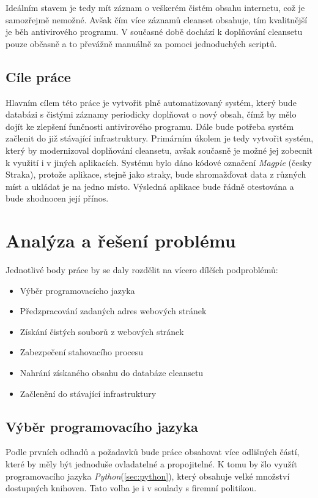 \documentclass[thesis=M,czech,hidelinks]{FITthesis}[2013/05/06]
\begin{document}
Ideálním stavem je tedy mít záznam o veškerém čistém obsahu internetu, což je samozřejmě nemožné. Avšak čím více záznamů cleanset obsahuje, tím kvalitnější je běh antivirového programu. V současné době dochází k doplňování cleansetu pouze občasně a to převážně manuálně za pomoci jednoduchých scriptů.

\section{Cíle práce} 
 Hlavním cílem této práce je vytvořit plně automatizovaný systém, který bude databázi s čistými záznamy periodicky doplňovat o nový obsah, čímž by mělo dojít ke zlepšení funčnosti antivirového programu. Dále bude potřeba systém začlenit do již stávající  infrastruktury. Primárním úkolem je tedy vytvořit systém, který by modernizoval doplňování cleansetu, avšak současně je možné jej zobecnit k využití i v jiných aplikacích. Systému bylo dáno kódové označení \textit{Magpie} (česky Straka), protože aplikace, stejně jako straky, bude shromažďovat data z různých míst a ukládat je na jedno místo. Výsledná aplikace bude řádně otestována a bude zhodnocen její přínos.


\chapter{Analýza a řešení problému}
Jednotlivé body práce by se daly rozdělit na vícero dílčích podproblémů:

\begin{itemize}
	\item Výběr programovacícho jazyka
	\item Předzpracování zadaných adres webových stránek
	\item Získání čistých souborů z webových stránek
	\item Zabezpečení stahovacího procesu
	\item Nahrání získaného obsahu do databáze cleansetu
	\item Začlenění do stávající infrastruktury
\end{itemize}

\section{Výběr programovacího jazyka}
Podle prvních odhadů a požadavků bude práce obsahovat více odlišných částí, které by měly být jednoduše ovladatelné a propojitelné. K tomu by šlo využít programovacího jazyka \textit{Python}(\ref{sec:python}), který obsahuje velké množství dostupných knihoven. Tato volba je i v soulady s firemní politikou.
\end{document}
